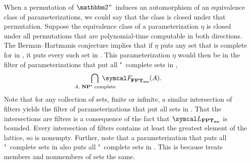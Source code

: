 When a permutation of $\binary^+$ induces an automorphism of an equivalence class of parameterizations, we could say that the class is closed under that permutation.
Suppose the equivalence class of a parameterization $\eta$ is closed under all permutations that are polynomial-time computable in both directions.
The Berman--Hartmanis conjecture implies that if $\eta$ puts any set that is complete for  in , it puts every such set in .
This parameterization $\eta$ would then be in the filter of parameterizations that put all "~complete sets in ,
\begin{equation*}
  \bigcap_{\mathclap{A\text{, \cl{NP}"~complete}}}\ \calF_\clnu{FPT}(A).
\end{equation*}
Note that for any collection of sets, finite or infinite, a similar intersection of filters yields the filter of parameterizations that put all sets in .
That the intersections are filters is a consequence of the fact that $\calL_\clnu{FPT}$ is bounded.
Every intersection of filters contains at least the greatest element of the lattice, so is nonempty.
Further, note that a parameterization that puts all "~complete sets in  also puts all "~complete sets in .
This is because  treats members and nonmembers of sets the same.

